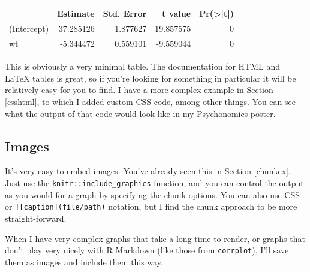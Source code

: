 \documentclass[
]{book}
\newenvironment{Shaded}{\begin{snugshade}}{\end{snugshade}}
\newcommand{\CommentTok}[1]{\textcolor[rgb]{0.56,0.35,0.01}{\textit{#1}}}
\newcommand{\KeywordTok}[1]{\textcolor[rgb]{0.13,0.29,0.53}{\textbf{#1}}}
\newcommand{\NormalTok}[1]{#1}
\newcommand{\OperatorTok}[1]{\textcolor[rgb]{0.81,0.36,0.00}{\textbf{#1}}}
\newcommand{\StringTok}[1]{\textcolor[rgb]{0.31,0.60,0.02}{#1}}
\begin{document}
\begin{Shaded}
\end{Shaded}

\begin{table}[H]
\centering
\begin{tabular}{l|r|r|r|r}
\hline
  & Estimate & Std. Error & t value & Pr(>|t|)\\
\hline
(Intercept) & 37.285126 & 1.877627 & 19.857575 & 0\\
\hline
wt & -5.344472 & 0.559101 & -9.559044 & 0\\
\hline
\end{tabular}
\end{table}

This is obviously a very minimal table. The documentation for HTML and LaTeX tables is great, so if you're looking for something in particular it will be relatively easy for you to find. I have a more complex example in Section \ref{csshtml}, to which I added custom CSS code, among other things. You can see what the output of that code would look like in my \href{https://github.com/hollzzar/psychonomics-poster/blob/master/Psychonomics.pdf}{Psychonomics poster}.

\hypertarget{images}{%
\subsection{Images}\label{images}}

It's very easy to embed images. You've already seen this in Section \ref{chunkex}. Just use the \texttt{knitr::include\_graphics} function, and you can control the output as you would for a graph by specifying the chunk options. You can also use CSS or \texttt{!{[}caption{]}(file/path)} notation, but I find the chunk approach to be more straight-forward.

When I have very complex graphs that take a long time to render, or graphs that don't play very nicely with R Markdown (like those from \texttt{corrplot}), I'll save them as images and include them this way.
\end{document}
